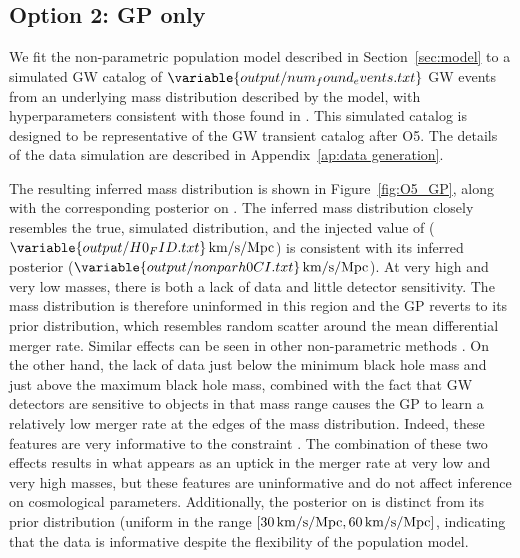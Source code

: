 \documentclass[]{aastex631}
\begin{document}
\subsection{Option 2: GP only}
We fit the non-parametric population model described in Section~\ref{sec:model} to a simulated \ac{GW} catalog of $\variable{output/num_found_events.txt}$ \ac{GW} events from an underlying mass distribution described by the \plp{} model, with hyperparameters consistent with those found in \citet{o3b_pop}.
This simulated catalog is designed to be representative of the \ac{GW}  transient catalog after \ac{O5}.
The details of the data simulation are described in Appendix~\ref{ap:data generation}.

The resulting inferred mass distribution is shown in Figure~\ref{fig:O5_GP}, along with the corresponding posterior on \Ho.
The inferred mass distribution closely resembles the true, simulated distribution, and the injected value of \Ho{} ($\variable{output/H0_FID.txt}\Hunits$) is consistent with its inferred posterior ($\variable{output/nonparh0CI.txt}\Hunits$).
At very high and very low masses, there is both a lack of data and little detector sensitivity.
The mass distribution is therefore uninformed in this region and the \ac{GP} reverts to its prior distribution, which resembles random scatter around the mean differential merger rate.
Similar effects can be seen in other non-parametric methods \citep{edelman_cover_2023, callister_parameter-free_2023}.
On the other hand, the lack of data just below the minimum black hole mass and just above the maximum black hole mass, combined with the fact that \ac{GW} detectors are sensitive to objects in that mass range causes the GP to learn a relatively low merger rate at the edges of the mass distribution.
Indeed, these features are very informative to the \Ho{} constraint \citep{the_ligo_scientific_collaboration_constraints_2021}.
The combination of these two effects results in what appears as an uptick in the merger rate at very low and very high masses, but these features are uninformative and do not affect inference on cosmological parameters.
Additionally, the posterior on \Ho{} is distinct from its prior distribution (uniform in the range $[30\,\text{km/s/Mpc},60\,\text{km/s/Mpc}]$, indicating that the data is informative despite the flexibility of the population model.
\end{document}
